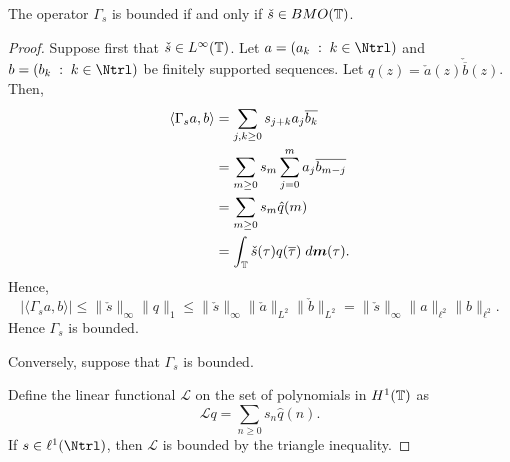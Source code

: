 \documentclass{unswmaths}
\begin{document}
\begin{theorem}
    The operator $\Gamma_s$ is bounded if and only if $\check{s} \in {BMO}(\mathbb{T})$.
\end{theorem}
\begin{proof}
    Suppose first that $\check{s} \in L^\infty(\mathbb{T})$. Let $a = (a_k\;:\;k \in \Ntrl)$
    and $b = (b_k\;:\; k\in \Ntrl)$ be finitely supported sequences. Let $q(z) = \check{a}(z)\check{\overline{b}}(z)$. Then,
    \begin{align*}
        \langle \Gamma_s a,b\rangle  &=  \sum_{j,k\geq0} s_{j+k}a_j\overline{b_k}\\
        &= \sum_{m\geq 0} s_m \sum_{j=0}^m a_j \overline{b_{m-j}}\\
        &= \sum_{m\geq 0} s_m \hat{q}(m)\\
        &= \int_{\mathbb{T}} \check{s}(\tau)q(\overline{\tau})\;d\boldsymbol{m}(\tau).
    \end{align*}
    Hence,
    \begin{equation*}
        |\langle \Gamma_s a,b\rangle| \leq \|\check{s}\|_\infty \|q\|_1 \leq \|\check{s}\|_\infty \|\check{a}\|_{L^2}\|\check{b}\|_{L^2} = \|\check{s}\|_\infty \|a\|_{\ell^2}\|b\|_{\ell^2}.
    \end{equation*}
    Hence $\Gamma_s$ is bounded. 
    
    Conversely, suppose that $\Gamma_s$ is bounded. 
    
    Define the linear functional $\mathcal{L}$ on the set of polynomials 
    in $H^1(\mathbb{T})$ as
    \begin{equation*}
        \mathcal{L}q = \sum_{n\geq 0} s_n\hat{q}(n).
    \end{equation*}
    If $s \in \ell^1(\Ntrl)$, then $\mathcal{L}$ is bounded by the triangle inequality.
    
\end{proof}
\end{document}
